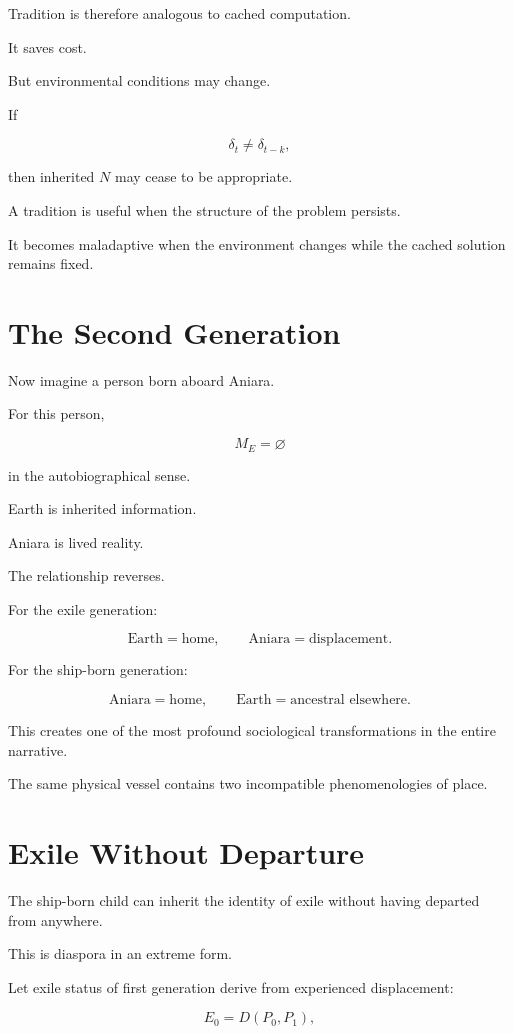 \documentclass[11pt,oneside]{book}
\theoremstyle{definition}
\theoremstyle{remark}
\begin{document}
Tradition is therefore analogous to cached computation.

It saves cost.

But environmental conditions may change.

If

\[
\delta_t\neq\delta_{t-k},
\]

then inherited \(N\) may cease to be appropriate.

A tradition is useful when the structure of the problem persists.

It becomes maladaptive when the environment changes while the cached solution remains fixed.

\section{The Second Generation}

Now imagine a person born aboard Aniara.

For this person,

\[
M_E=\varnothing
\]

in the autobiographical sense.

Earth is inherited information.

Aniara is lived reality.

The relationship reverses.

For the exile generation:

\[
\text{Earth}=\text{home},
\qquad
\text{Aniara}=\text{displacement}.
\]

For the ship-born generation:

\[
\text{Aniara}=\text{home},
\qquad
\text{Earth}=\text{ancestral elsewhere}.
\]

This creates one of the most profound sociological transformations in the entire narrative.

The same physical vessel contains two incompatible phenomenologies of place.

\section{Exile Without Departure}

The ship-born child can inherit the identity of exile without having departed from anywhere.

This is diaspora in an extreme form.

Let exile status of first generation derive from experienced displacement:

\[
E_0
=
D(P_0,P_1),
\]
\end{document}
